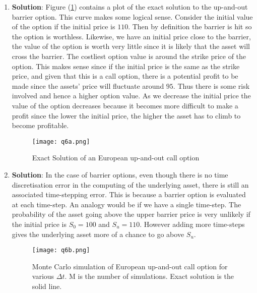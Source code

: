 \documentclass[10pt,english]{article}
\theoremstyle{plain}
\newcommand{\dt}{\Delta t}
\begin{document}
\begin{enumerate}
 \begin{enumerate}
\item \textbf{Solution}: Figure (\ref{q6a}) contains a plot of the exact solution to the up-and-out barrier option. This curve makes some logical sense. Consider the initial value of the option if the initial price is $110$. Then by definition the barrier is hit so the option is worthless. Likewise, we have an initial price close to the barrier, the value of the option is worth very little since it is likely that the asset will cross the barrier. The costliest option value is around the strike price of the option. This makes sense since if the initial price is the same as the strike price, and given that this is a call option, there is a potential profit to be made since the assets' price will fluctuate around $95$. Thus there is some risk involved and hence a higher option value. As we decrease the initial price the value of the option decreases because it becomes more difficult to make a profit since the lower the initial price, the higher the asset has to climb to become profitable. 
\begin{figure}
\begin{center}
\texttt{[image: q6a.png]}
\end{center}
\caption{Exact Solution of an European up-and-out call option}\label{q6a}
\end{figure}

\item \textbf{Solution}: In the case of barrier options, even though there is no time discretisation error in the computing of the underlying asset, there is still an associated time-stepping error. This is because a barrier option is evaluated at each time-step. An analogy would be if we have a single time-step. The probability of the asset going above the upper barrier price is very unlikely if the initial price is $S_{0}=100$ and $S_{u}=110$. However adding more time-steps gives the underlying asset more of a chance to go above $S_{u}$. 
\begin{figure}
\begin{center}
\texttt{[image: q6b.png]}
\end{center}
\caption{Monte Carlo simulation of European up-and-out call option for various $\dt$. M is the number of simulations. Exact solution is the solid line.}\label{q6b}
\end{figure}


\end{enumerate}
\end{enumerate}
\end{document}
